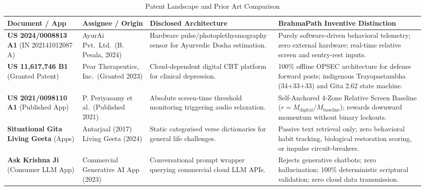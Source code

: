 \documentclass[11pt,a4paper]{article}
\begin{document}
\begin{table}[t]
\centering
\small
\caption{Patent Landscape and Prior Art Comparison}
\label{tab:patent-comparison}
\begin{tabularx}{\textwidth}{p{3.2cm}p{3.5cm}p{4.2cm}X}
\toprule
\textbf{Document / App} & \textbf{Assignee / Origin} & \textbf{Disclosed Architecture} & \textbf{BrahmaPath Inventive Distinction} \\
\midrule
\textbf{US 2024/0008813 A1} \newline (IN 202141012087 A) & AyurAi Pvt.\ Ltd.\ \newline (B. Pesala, 2024) & Hardware pulse/photoplethysmography sensor for Ayurvedic Dosha estimation. & Purely software-driven behavioral telemetry; zero external hardware; real-time relative screen and sentry-rest inputs. \\
\addlinespace
\textbf{US 11,617,746 B1} \newline (Granted Patent) & Pear Therapeutics, Inc.\ \newline (Granted 2023) & Cloud-dependent digital CBT platform for clinical depression. & 100\% offline OPSEC architecture for defense forward posts; indigenous Trayopastambha (34+33+33) and Gita 2.62 state machine. \\
\addlinespace
\textbf{US 2021/0098110 A1} \newline (Published App) & P. Periyasamy et al.\ \newline (Published 2021) & Absolute screen-time threshold monitoring triggering audio relaxation. & Self-Anchored 4-Zone Relative Screen Baseline ($r = M_{\text{digital}}/M_{\text{baseline}}$); rewards downward momentum without binary lockouts. \\
\addlinespace
\textbf{Situational Gita} \newline \textbf{Living Geeta} (Apps) & Antarjaal (2017) \newline Living Geeta (2024) & Static categorised verse dictionaries for general life challenges. & Passive text retrieval only; zero behavioral habit tracking, biological restoration scoring, or impulse circuit-breakers. \\
\addlinespace
\textbf{Ask Krishna Ji} \newline (Consumer LLM App) & Commercial Generative AI App (2023) & Conversational prompt wrapper querying commercial cloud LLM APIs. & Rejects generative chatbots; zero hallucination; 100\% deterministic scriptural validation; zero cloud data transmission. \\
\bottomrule
\end{tabularx}
\end{table}
\end{document}
